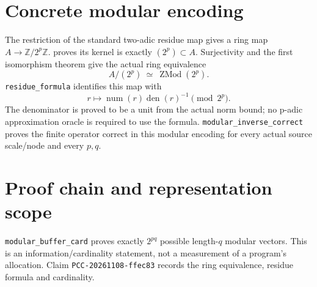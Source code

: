 \documentclass[10pt]{article}
\begin{document}
\section*{Concrete modular encoding}
The restriction of the standard two-adic residue map gives a ring map
$A\to\mathbb Z/2^p\mathbb Z$. 
proves its kernel is exactly $(2^p)\subset A$. Surjectivity and the first
isomorphism theorem give the actual ring equivalence
\[A/(2^p)\ \simeq\ \operatorname{ZMod}(2^p).\]
\texttt{residue\_formula} identifies this map with
\[r\longmapsto\operatorname{num}(r)\operatorname{den}(r)^{-1}\pmod{2^p}.\]
The denominator is proved to be a unit from the actual norm bound; no
p-adic approximation oracle is required to use the formula.
\texttt{modular\_inverse\_correct} proves the finite operator correct in
this modular encoding for every actual source scale/node and every $p,q$.

\newpage
\section*{Proof chain and representation scope}
\begin{center}\end{center}
\texttt{modular\_buffer\_card} proves exactly $2^{pq}$ possible length-$q$
modular vectors. This is an information/cardinality statement, not a measurement
of a program's allocation. Claim \texttt{PCC-20261108-ffec83} records the
ring equivalence, residue formula and cardinality.
\end{document}
